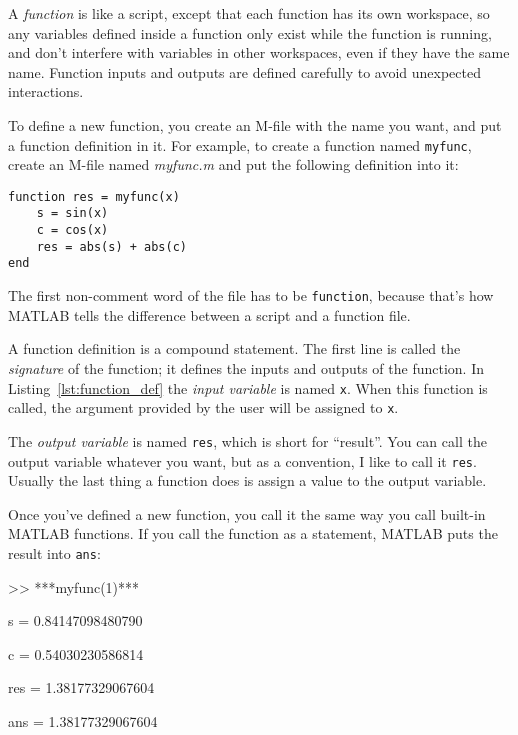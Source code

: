 A {\em function} is like a script, except that each function has its own workspace, so any variables defined
inside a function only exist while the function is running, and don't
interfere with variables in other workspaces, even if they have the
same name. 
Function inputs and outputs are defined carefully to avoid
unexpected interactions.

To define a new function, you create an M-file with the name you
want, and put a function definition in it.  For example, to create
a function named {\tt myfunc}, create an M-file named {\em myfunc.m}
and put the following definition into it:


\begin{lstlisting}[caption={A function definition}, label={lst:function_def}]
function res = myfunc(x)
    s = sin(x)
    c = cos(x)
    res = abs(s) + abs(c)
end
\end{lstlisting}

The first non-comment word of the file has to be {\tt function}, because
that's how MATLAB tells the difference between a script and a function
file.


A function definition is a compound statement.  The first line
is called the {\em signature} of the function; it defines
the inputs and outputs of the function.  In Listing~\ref{lst:function_def} the {\em input variable} is named {\tt x}.  When this function is called, the
argument provided by the user will be assigned to {\tt x}.



The {\em output variable} is named {\tt res}, which is short for
``result''.  You can call the output variable whatever you want, but
as a convention, I like to call it {\tt res}.  Usually the last
thing a function does is assign a value to the output variable.


Once you've defined a new function, you call it the same way you
call built-in MATLAB functions.  If you call the function as a statement,
MATLAB puts the result into {\tt ans}:

\begin{code}
>> ***myfunc(1)***

s = 0.84147098480790

c = 0.54030230586814

res = 1.38177329067604

ans = 1.38177329067604
\end{code}

